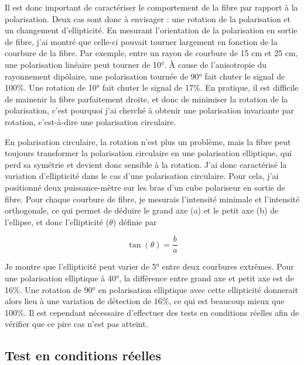 Il est donc important de caractériser le comportement de la fibre par rapport à la polarisation. Deux cas sont donc à envisager : une rotation de la polarisation et un changement d'ellipticité. En mesurant l'orientation de la polarisation en sortie de fibre, j'ai montré que celle-ci pouvait tourner largement en fonction de la courbure de la fibre. Par exemple, entre un rayon de courbure de 15 cm et 25 cm, une polarisation linéaire peut tourner de 10°. À cause de l'anisotropie du rayonnement dipôlaire, une polarisation tournée de 90° fait chuter le signal de 100\%. Une rotation de 10° fait chuter le signal de 17\%. En pratique, il est difficile de mainenir la fibre parfaitement droite, et donc de minimiser la rotation de la polarisation, c'est pourquoi j'ai cherché à obtenir une polarisation invariante par rotation, c'est-à-dire une polarisation circulaire.


En polarisation circulaire, la rotation n'est plus un problème, mais la fibre peut toujours transformer la polarisation circulaire en une polarisation elliptique, qui perd sa symétrie et devient donc sensible à la rotation. J'ai donc caractérisé la variation d'ellipticité dans le cas d'une polarisation circulaire. Pour cela, j'ai positionné deux puissance-mètre sur les bras d'un cube polariseur en sortie de fibre. Pour chaque courbure de fibre, je mesurais l'intensité minimale et l'intensité orthogonale, ce qui permet de déduire le grand axe (a) et le petit axe (b) de l'ellipse, et donc l'ellipticité ($\theta$) définie par

$$
\tan(\theta)=\frac{b}{a} 
$$

Je montre que l'ellipticité peut varier de 5° entre deux courbures extrêmes. Pour une polarisation elliptique à 40°, la différence entre grand axe et petit axe est de 16\%. Une rotation de 90° en polarisation elliptique avec cette ellipticité donnerait alors lieu à une variation de détection de 16\%, ce qui est beaucoup mieux que 100\%. Il est cependant nécessaire d'effectuer des tests en conditions réelles afin de vérifier que ce pire cas n'est pas atteint.

\subsection{Test en conditions réelles}

